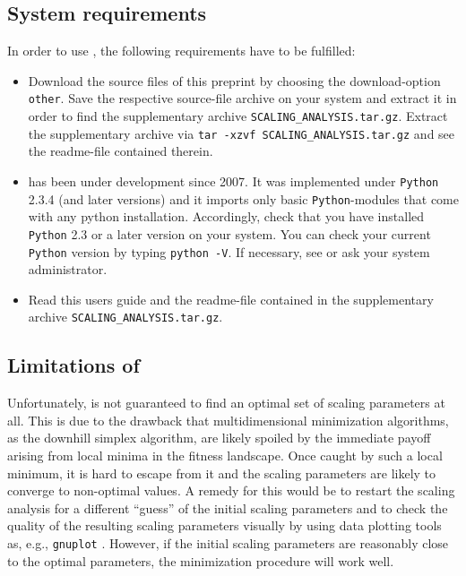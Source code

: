 \subsection{System requirements}
\label{ASAsect04subsect00}
In order to use \myProg{}, the following requirements have to be fulfilled:
\begin{itemize}
\item Download the source files of this preprint by choosing 
      the download-option \verb|other|. 
      Save the respective source-file archive on your system and extract it in 
      order to find the supplementary archive \verb|SCALING_ANALYSIS.tar.gz|. 
      Extract the supplementary archive via \verb|tar -xzvf SCALING_ANALYSIS.tar.gz|
      and see the readme-file contained therein.
\item \myProg{} has been under development since 2007. It was implemented 
      under {\tt Python} 2.3.4 (and later versions) and it imports only basic 
      {\tt Python}-modules that come with any python installation. 
      Accordingly, check that
      you have installed {\tt Python} 2.3 or a later version on your system. You can
      check your current {\tt Python} version by typing \verb|python -V|. 
      If necessary, see \cite{ASApyRef} or ask your system administrator.
\item Read this users guide and the readme-file contained in the supplementary 
      archive \verb|SCALING_ANALYSIS.tar.gz|.
\end{itemize}

\subsection{Limitations of \myProg{}}
\label{ASAsect04subsect01}
Unfortunately, \myProg{} is not guaranteed to find an optimal set of scaling parameters at all. 
This is due to the drawback that multidimensional minimization algorithms, as the downhill simplex algorithm, 
are likely spoiled by the immediate payoff arising from local minima in the fitness landscape. 
Once caught by such a local minimum, it is hard to escape from it and the scaling parameters are likely to 
converge to non-optimal values.
A remedy for this would be to restart the scaling analysis for a different ``guess'' of the initial scaling parameters
and to check the quality of the resulting scaling parameters visually by using data 
plotting tools as, e.g., {\tt gnuplot} \cite{ASAgnuplotRef}.
However, if the initial scaling parameters are reasonably close to the optimal parameters, the 
minimization procedure will work well.

